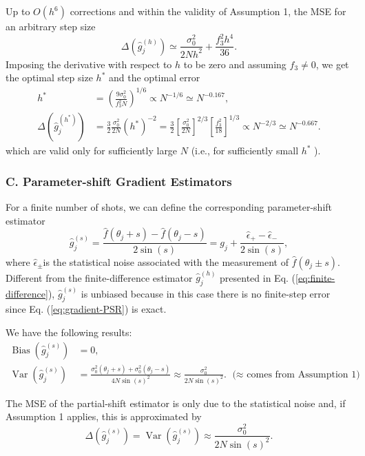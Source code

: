 Up to $O\left(h^6\right)$ corrections and within the validity of Assumption 1, the MSE for an arbitrary step size
\begin{equation}
    \Delta\left(\hat{g}_j^{(h)}\right) \simeq \frac{\sigma_0^2}{2 N h^2}+\frac{f_3^2 h^4}{36} .
\end{equation}
Imposing the derivative with respect to $h$ to be zero and assuming $f_3 \neq 0$, we get the optimal step size $h^*$ and the optimal error
\begin{equation}
    \begin{aligned}
h^* & =\left(\frac{9 \sigma_0^2}{f_3^2 N}\right)^{1 / 6} \propto N^{-1 / 6} \simeq N^{-0.167}, \\
\Delta\left(\hat{g}_j^{\left(h^*\right)}\right) & =\frac{3}{2} \frac{\sigma_0^2}{2 N}\left(h^*\right)^{-2}=\frac{3}{2}\left[\frac{\sigma_0^2}{2 N}\right]^{2 / 3}\left[\frac{f_3^2}{18}\right]^{1 / 3} \propto N^{-2 / 3} \simeq N^{-0.667}.
\end{aligned}
\end{equation}
which are valid only for sufficiently large $N$ (i.e., for sufficiently small $h^*$ ).

\subsubsection{C. Parameter-shift Gradient Estimators}

For a finite number of shots, we can define the corresponding parameter-shift estimator
\begin{equation}
    \hat{g}_j^{(s)}=\frac{\hat{f}\left(\theta_j+s\right)-\hat{f}\left(\theta_j-s\right)}{2 \sin (s)}=g_j+\frac{\hat{\epsilon}_{+}-\hat{\epsilon}_{-}}{2 \sin (s)},
\end{equation}
where $\hat{\epsilon}_{ \pm}$is the statistical noise associated with the measurement of $\hat{f}\left(\theta_j \pm s\right)$. Different from the finite-difference estimator $\hat{g}_j^{(h)}$ presented in Eq. (\ref{eq:finite-difference}), $\hat{g}_j^{(s)}$ is unbiased because in this case there is no finite-step error since Eq. (\ref{eq:gradient-PSR}) is exact.

\begin{theorem}
    We have the following results: 
\begin{align}
\operatorname{Bias}\left(\hat{g}_j^{(s)}\right) & =0, \\
\operatorname{Var}\left(\hat{g}_j^{(s)}\right) & =\frac{\sigma_0^2\left(\theta_j+s\right)+\sigma_0^2\left(\theta_j-s\right)}{4 N \sin (s)^2} \approx \frac{\sigma_0^2}{2 N \sin (s)^2} .  \text{ ($\approx$ comes from Assumption 1)}
\end{align}
\end{theorem}
The MSE of the partial-shift estimator is only due to the statistical noise and, if Assumption 1 applies, this is approximated by
\begin{equation}
    \Delta\left(\hat{g}_j^{(s)}\right)=\operatorname{Var}\left(\hat{g}_j^{(s)}\right) \approx \frac{\sigma_0^2}{2 N \sin (s)^2} .
\end{equation}
